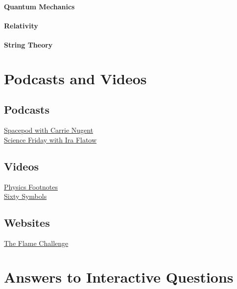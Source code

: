 \documentclass[11pt,letter,openany,makeidx]{book}
\begin{document}
\subsubsection{Quantum Mechanics}
\subsubsection{Relativity}
\subsubsection{String Theory}



\chapter{Podcasts and Videos}\label{c:videos}\label{c:podcasts}

\section{Podcasts}\label{s:podcasts}
\hyperref{http://spacepod.libsyn.com/}{T4LTFdOxHD5WWzdD}{99}{Spacepod with Carrie Nugent} \\
\href{http://www.sciencefriday.com/}{Science Friday with Ira Flatow}

\section{Videos}\label{s:videos}
\href{http://physicsfootnotes.com/}{Physics Footnotes} \\
\href{http://sixtysymbols.com/}{Sixty Symbols}

\section{Websites}\label{s:websites}
\href{http://www.aldakavlilearningcenter.org/practice/flame-challenge}{The Flame Challenge}

\chapter{Answers to Interactive Questions}
\end{document}
